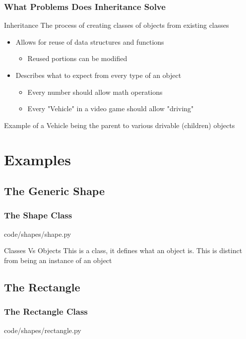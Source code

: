 \documentclass{beamer}
\begin{document}
  \begin{frame}
    \frametitle{What Problems Does Inheritance Solve}
    \begin{block}{Inheritance}
      The process of creating classes of objects from existing classes
    \end{block}
    \begin{itemize}
      \item<1->Allows for reuse of data structures and functions
        \begin{itemize}
          \item Reused portions can be modified
        \end{itemize}
      \item<2->Describes what to expect from every type of an object
        \begin{itemize}
          \item Every number should allow math operations
          \item Every "Vehicle" in a video game should allow "driving"
        \end{itemize}
    \end{itemize}
    \pause
    Example of a Vehicle being the parent to various drivable (children) objects
  \end{frame}

\section{Examples}
\subsection{The Generic Shape}
  \begin{frame}
    \frametitle{The Shape Class}
    code/shapes/shape.py
    
    \begin{block}{Classes Vs Objects}
      This is a class, it defines what an object is.
      This is distinct from being an instance of an object
    \end{block}
  \end{frame}

\subsection{The Rectangle}
  \begin{frame}
    \frametitle{The Rectangle Class}
    code/shapes/rectangle.py
    
  \end{frame}
\end{document}
